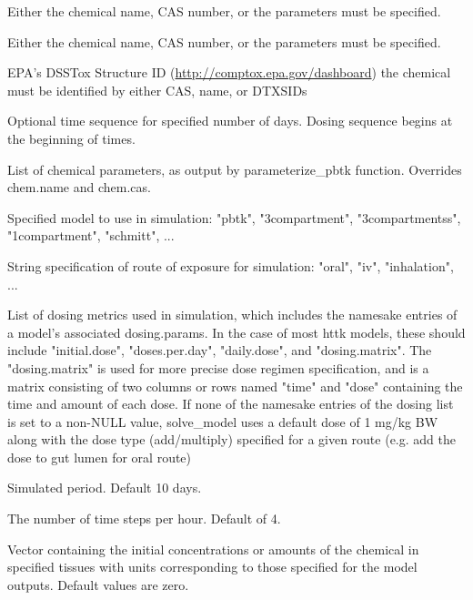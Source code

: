 \documentclass[a4paper]{book}
\begin{document}
%
\begin{Arguments}
\begin{ldescription}
\item[\code{chem.name}] Either the chemical name, CAS number, or the parameters
must be specified.

\item[\code{chem.cas}] Either the chemical name, CAS number, or the parameters must
be specified.

\item[\code{dtxsid}] EPA's DSSTox Structure ID (\url{http://comptox.epa.gov/dashboard})
the chemical must be identified by either CAS, name, or DTXSIDs

\item[\code{times}] Optional time sequence for specified number of days. Dosing
sequence begins at the beginning of times.

\item[\code{parameters}] List of chemical parameters, as output by 
parameterize\_pbtk function. Overrides chem.name and chem.cas.

\item[\code{model}] Specified model to use in simulation: "pbtk", "3compartment",
"3compartmentss", "1compartment", "schmitt", ...

\item[\code{route}] String specification of route of exposure for simulation:
"oral", "iv", "inhalation", ...

\item[\code{dosing}] List of dosing metrics used in simulation, which includes
the namesake entries of a model's associated dosing.params. In the case
of most httk models, these should include "initial.dose", "doses.per.day", 
"daily.dose", and "dosing.matrix". The "dosing.matrix" is used for more
precise dose regimen specification, and is a matrix consisting of two
columns or rows named "time" and "dose" containing the time and amount of 
each dose. If none of the namesake entries of the dosing list is set to a
non-NULL value, solve\_model uses a default dose of 1 mg/kg BW along with the 
dose type (add/multiply) specified for a given route (e.g. add the dose to gut
lumen for oral route)

\item[\code{days}] Simulated period. Default 10 days.

\item[\code{tsteps}] The number of time steps per hour. Default of 4.

\item[\code{initial.values}] Vector containing the initial concentrations or
amounts of the chemical in specified tissues with units corresponding to
those specified for the model outputs. Default values are zero.


\end{ldescription}
\end{Arguments}
\end{document}
